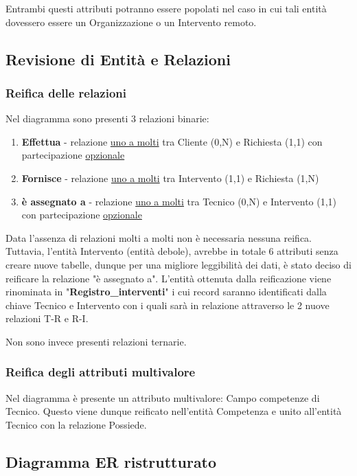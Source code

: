 \documentclass{article}
\begin{document}
Entrambi questi attributi potranno essere popolati nel caso in cui tali entità dovessero essere un Organizzazione o un Intervento remoto.



\subsection{Revisione di Entità e Relazioni}

\subsubsection{Reifica delle relazioni}

Nel diagramma sono presenti 3 relazioni binarie:

\begin{enumerate}
    \item \textbf{Effettua} - relazione \underline{uno a molti} tra Cliente (0,N) e Richiesta (1,1) con partecipazione \underline{opzionale}
    \item \textbf{Fornisce} - relazione \underline{uno a molti} tra Intervento (1,1) e Richiesta (1,N)
    \item \textbf{è assegnato a} - relazione \underline{uno a molti} tra Tecnico (0,N) e Intervento (1,1) con partecipazione \underline{opzionale}
\end{enumerate}

Data l'assenza di relazioni molti a molti non è necessaria nessuna reifica. Tuttavia, l'entità Intervento (entità debole), avrebbe in totale 6 attributi senza creare nuove tabelle, dunque per una migliore leggibilità dei dati, è stato deciso di reificare la relazione "è assegnato a". L'entità ottenuta dalla reificazione viene rinominata in "\textbf{Registro\_interventi}" i cui record saranno identificati dalla chiave Tecnico e Intervento con i quali sarà in relazione attraverso le 2 nuove relazioni T-R e R-I.

Non sono invece presenti relazioni ternarie.

\subsubsection{Reifica degli attributi multivalore}
Nel diagramma è presente un attributo multivalore: Campo competenze di Tecnico. Questo viene dunque reificato nell'entità Competenza e unito all'entità Tecnico con la relazione Possiede.

\newpage

\subsection{Diagramma ER ristrutturato}
\end{document}
